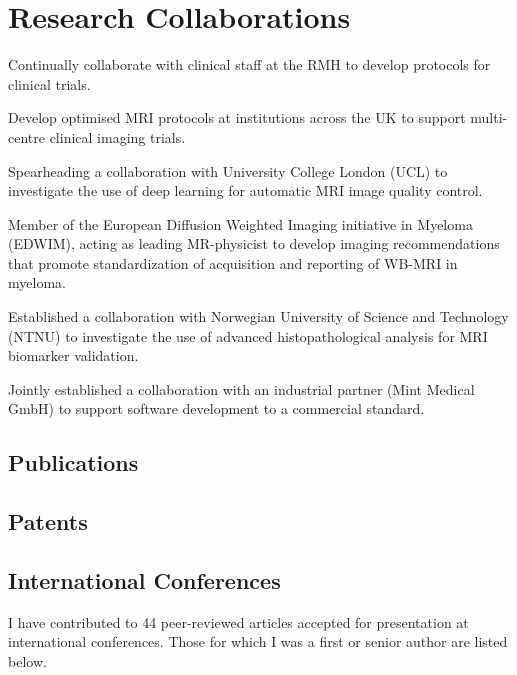 \documentclass[]{mbcv}
\begin{document}
{\section{Research Collaborations}
\vspace*{10pt}
\begin{tightemize}
\item Continually collaborate with clinical staff at the RMH to develop protocols for clinical trials.
\item Develop optimised MRI protocols at institutions across the UK to support multi-centre clinical imaging trials.
\item Spearheading a collaboration with University College London (UCL) to investigate the use of deep learning for automatic MRI image quality control.
\item Member of the European Diffusion Weighted Imaging initiative in Myeloma (EDWIM), acting as leading MR-physicist to develop imaging recommendations that promote standardization of acquisition and reporting of WB-MRI in myeloma.
\item Established a collaboration with Norwegian University of Science and Technology (NTNU) to investigate the use of advanced histopathological analysis for MRI biomarker validation.
\item Jointly established a collaboration with an industrial partner (Mint Medical GmbH) to support software development to a commercial standard.
\end{tightemize}

\newpage

\begin{refsection}
\nocite{*}
\section{Publications}
\vspace*{10pt}
\printbibliography[heading=none]
\end{refsection}
\begin{refsection}
\nocite{*}
\section{Patents}
\vspace*{10pt}
\printbibliography[heading=none]
\end{refsection}
\begin{refsection}
\nocite{*}
\section{International Conferences}
\vspace*{10pt}
\begin{flushleft}
I have contributed to 44 peer-reviewed articles accepted for presentation at international conferences.  Those for which I was a first or senior author are listed below.
\end{flushleft}
\printbibliography[heading=none]
\end{refsection}
\clearpage
\restoregeometry
}
%
%
%
%
\end{document}
